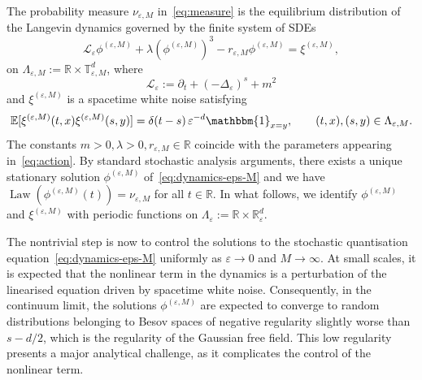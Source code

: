 \documentclass{article}
\numberwithin{equation}{section}
\newcommand{\assign}{:=}
\theoremstyle{plain}
\theoremstyle{definition}
\begin{document}
The probability measure $\nu_{\varepsilon, M}$ in~\eqref{eq:measure} is the
equilibrium distribution of the Langevin dynamics governed by the finite
system of SDEs
\begin{equation}
  \mathcal{L}_{\varepsilon} \phi^{(\varepsilon, M)} + \lambda
  {(\phi^{(\varepsilon, M)})^3}  - r_{\varepsilon, M} \phi^{(\varepsilon, M)}
  = \xi^{(\varepsilon, M)}, \label{eq:dynamics-eps-M}
\end{equation}
on $\Lambda_{\varepsilon, M} \assign \mathbb{R} \times
\mathbb{T}_{\varepsilon, M}^d$, where
\[ \mathcal{L}_{\varepsilon} \assign \partial_t + (- \Delta_{\varepsilon})^s +
   m^2 \]
and $\xi^{(\varepsilon, M)}$ is a spacetime white noise satisfying
\[ 
\mathbb{E} [\xi^{(\varepsilon, M)} (t, x) \xi^{(\varepsilon, M)} (s, y)] =
   \delta (t - s) \,\varepsilon^{-d}\mathbbm{1}_{x = y}, \qquad (t, x), (s, y) \in
   \Lambda_{\varepsilon, M} . \]
The constants $m > 0, \lambda > 0, r_{\varepsilon, M} \in \mathbb{R}$ coincide
with the parameters appearing in~\eqref{eq:action}. By standard stochastic
analysis arguments, there exists a unique stationary solution
$\phi^{(\varepsilon, M)}$ of~\eqref{eq:dynamics-eps-M} and we have $\operatorname{Law}
(\phi^{(\varepsilon, M)} (t)) = \nu_{\varepsilon, M}$ for all $t \in
\mathbb{R}$. In what follows, we identify $\phi^{(\varepsilon, M)}$ and
$\xi^{(\varepsilon, M)}$ with periodic functions on
\(\Lambda_{\varepsilon}:=\mathbb{R}\times \mathbb{R}_{\varepsilon}^d\).

The nontrivial step is now to control the solutions to the stochastic
quantisation equation~\eqref{eq:dynamics-eps-M} uniformly as $\varepsilon
\rightarrow 0$ and $M \rightarrow \infty$. At small scales, it is expected
that the nonlinear term in the dynamics is a perturbation of the linearised
equation driven by spacetime white noise. Consequently, in the continuum
limit, the solutions $\phi^{(\varepsilon, M)}$ are expected to converge to
random distributions belonging to Besov spaces of negative regularity slightly
worse than $s - d / 2$, which is the regularity of the Gaussian free field.
This low regularity presents a major analytical challenge, as it complicates
the control of the nonlinear term.
\end{document}
